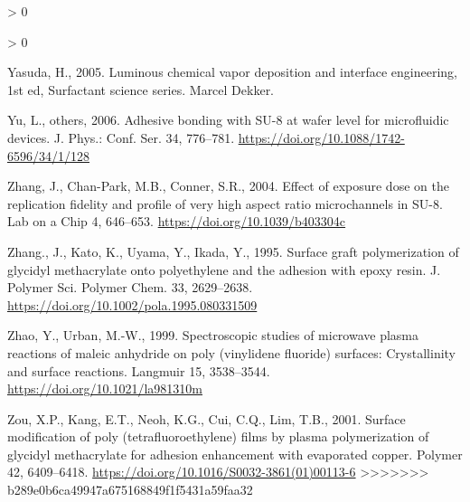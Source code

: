\documentclass[
  11pt,
  twoside]{article}
\newlength{\cslhangindent}
\newenvironment{CSLReferences}[2] %
 {%
  \setlength{\parindent}{0pt}
  \ifodd #1 \everypar{\setlength{\hangindent}{\cslhangindent}}\ignorespaces\fi
  \ifnum #2 > 0
  \setlength{\parskip}{#2\baselineskip}
  \fi
 }%
 {}
\begin{document}
\begin{CSLReferences}{1}{0}
\begin{CSLReferences}{1}{0}
\leavevmode\hypertarget{ref-Yasu05}{}%
Yasuda, H., 2005. Luminous chemical vapor deposition and interface engineering, 1st ed, Surfactant science series. Marcel Dekker.

\leavevmode\hypertarget{ref-Yu06}{}%
Yu, L., others, 2006. Adhesive bonding with SU-8 at wafer level for microfluidic devices. J. Phys.: Conf. Ser. 34, 776--781. \url{https://doi.org/10.1088/1742-6596/34/1/128}

\leavevmode\hypertarget{ref-Zhan04}{}%
Zhang, J., Chan-Park, M.B., Conner, S.R., 2004. Effect of exposure dose on the replication fidelity and profile of very high aspect ratio microchannels in {SU-8}. Lab on a Chip 4, 646--653. \url{https://doi.org/10.1039/b403304c}

\leavevmode\hypertarget{ref-Zhan1995}{}%
Zhang., J., Kato, K., Uyama, Y., Ikada, Y., 1995. Surface graft polymerization of glycidyl methacrylate onto polyethylene and the adhesion with epoxy resin. J. Polymer Sci. Polymer Chem. 33, 2629--2638. \url{https://doi.org/10.1002/pola.1995.080331509}

\leavevmode\hypertarget{ref-Zhao1999}{}%
Zhao, Y., Urban, M.-W., 1999. Spectroscopic studies of microwave plasma reactions of maleic anhydride on poly (vinylidene fluoride) surfaces: Crystallinity and surface reactions. Langmuir 15, 3538--3544. \url{https://doi.org/10.1021/la981310m}

\leavevmode\hypertarget{ref-Zou01}{}%
Zou, X.P., Kang, E.T., Neoh, K.G., Cui, C.Q., Lim, T.B., 2001. Surface modification of poly (tetrafluoroethylene) films by plasma polymerization of glycidyl methacrylate for adhesion enhancement with evaporated copper. Polymer 42, 6409--6418. \url{https://doi.org/10.1016/S0032-3861(01)00113-6}
>>>>>>> b289e0b6ca49947a675168849f1f5431a59faa32

\end{CSLReferences}
\end{document}
